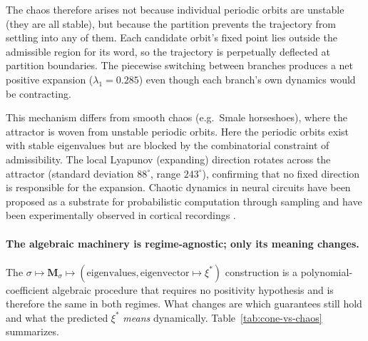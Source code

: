 \documentclass[12pt]{article}
\newcommand{\vv}[1]{\mathbf{#1}}
\begin{document}
The chaos therefore arises not because individual periodic orbits are unstable (they are all stable), but because the partition prevents the trajectory from settling into any of them. Each candidate orbit's fixed point lies outside the admissible region for its word, so the trajectory is perpetually deflected at partition boundaries. The piecewise switching between branches produces a net positive expansion ($\lambda_1=0.285$) even though each branch's own dynamics would be contracting.

This mechanism differs from smooth chaos (e.g.\ Smale horseshoes), where the attractor is woven from unstable periodic orbits. Here the periodic orbits exist with stable eigenvalues but are blocked by the combinatorial constraint of admissibility. The local Lyapunov (expanding) direction rotates across the attractor (standard deviation $88^\circ$, range $243^\circ$), confirming that no fixed direction is responsible for the expansion. Chaotic dynamics in neural circuits have been proposed as a substrate for probabilistic computation through sampling \citep{terada2024chaotic} and have been experimentally observed in cortical recordings \citep{korn2003there,sarbadhikari2001chaos}.

\paragraph{The algebraic machinery is regime-agnostic; only its meaning changes.}
The $\sigma\mapsto\vv{M}_\sigma\mapsto(\text{eigenvalues},\text{eigenvector}\mapsto\xi^*)$ construction is a polynomial-coefficient algebraic procedure that requires no positivity hypothesis and is therefore the same in both regimes. What changes are which guarantees still hold and what the predicted $\xi^*$ \emph{means} dynamically. Table~\ref{tab:cone-vs-chaos} summarizes.
\end{document}

